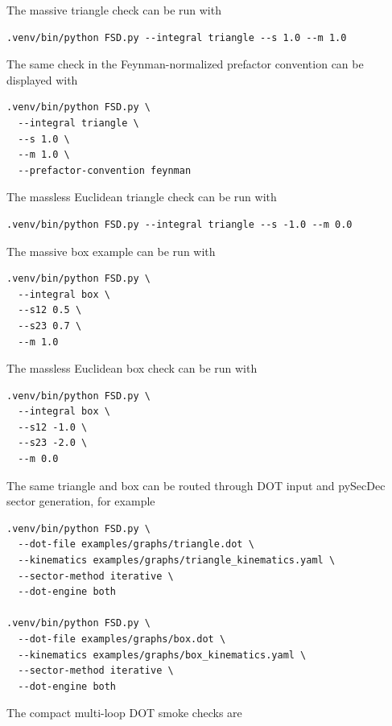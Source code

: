 \documentclass[11pt]{article}
\begin{document}
The massive triangle check can be run with
\begin{lstlisting}[style=fsdcode]
.venv/bin/python FSD.py --integral triangle --s 1.0 --m 1.0
\end{lstlisting}
The same check in the Feynman-normalized prefactor convention can be displayed
with
\begin{lstlisting}[style=fsdcode]
.venv/bin/python FSD.py \
  --integral triangle \
  --s 1.0 \
  --m 1.0 \
  --prefactor-convention feynman
\end{lstlisting}
The massless Euclidean triangle check can be run with
\begin{lstlisting}[style=fsdcode]
.venv/bin/python FSD.py --integral triangle --s -1.0 --m 0.0
\end{lstlisting}
The massive box example can be run with
\begin{lstlisting}[style=fsdcode]
.venv/bin/python FSD.py \
  --integral box \
  --s12 0.5 \
  --s23 0.7 \
  --m 1.0
\end{lstlisting}
The massless Euclidean box check can be run with
\begin{lstlisting}[style=fsdcode]
.venv/bin/python FSD.py \
  --integral box \
  --s12 -1.0 \
  --s23 -2.0 \
  --m 0.0
\end{lstlisting}
The same triangle and box can be routed through DOT input and pySecDec sector
generation, for example
\begin{lstlisting}[style=fsdcode]
.venv/bin/python FSD.py \
  --dot-file examples/graphs/triangle.dot \
  --kinematics examples/graphs/triangle_kinematics.yaml \
  --sector-method iterative \
  --dot-engine both

.venv/bin/python FSD.py \
  --dot-file examples/graphs/box.dot \
  --kinematics examples/graphs/box_kinematics.yaml \
  --sector-method iterative \
  --dot-engine both
\end{lstlisting}
The compact multi-loop DOT smoke checks are
\end{document}
